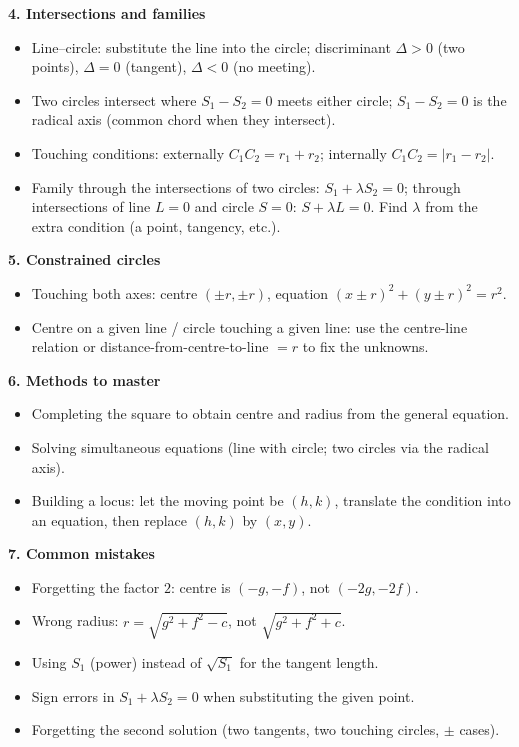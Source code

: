 \documentclass[11pt]{article}
\newcommand{\cle}[1]{{\popxbold\color{popdark}#1}}
\begin{document}
\begin{bilan}
\textbf{4. Intersections and families}
\begin{itemize}
\item Line--circle: substitute the line into the circle; discriminant $\Delta>0$ (two points), $\Delta=0$ (tangent), $\Delta<0$ (no meeting).
\item Two circles intersect where $S_1-S_2=0$ meets either circle; $S_1-S_2=0$ is the \cle{radical axis} (common chord when they intersect).
\item Touching conditions: externally $C_1C_2=r_1+r_2$; internally $C_1C_2=|r_1-r_2|$.
\item Family through the intersections of two circles: $S_1+\lambda S_2=0$; through intersections of line $L=0$ and circle $S=0$: $S+\lambda L=0$. Find $\lambda$ from the extra condition (a point, tangency, etc.).
\end{itemize}

\textbf{5. Constrained circles}
\begin{itemize}
\item Touching both axes: centre $(\pm r,\pm r)$, equation $(x\pm r)^2+(y\pm r)^2=r^2$.
\item Centre on a given line / circle touching a given line: use the centre-line relation or distance-from-centre-to-line $=r$ to fix the unknowns.
\end{itemize}

\textbf{6. Methods to master}
\begin{itemize}
\item Completing the square to obtain centre and radius from the general equation.
\item Solving simultaneous equations (line with circle; two circles via the radical axis).
\item Building a locus: let the moving point be $(h,k)$, translate the condition into an equation, then replace $(h,k)$ by $(x,y)$.
\end{itemize}

\textbf{7. Common mistakes}
\begin{itemize}
\item Forgetting the factor $2$: centre is $(-g,-f)$, not $(-2g,-2f)$.
\item Wrong radius: $r=\sqrt{g^2+f^2-c}$, not $\sqrt{g^2+f^2+c}$.
\item Using $S_1$ (power) instead of $\sqrt{S_1}$ for the tangent length.
\item Sign errors in $S_1+\lambda S_2=0$ when substituting the given point.
\item Forgetting the second solution (two tangents, two touching circles, $\pm$ cases).
\end{itemize}


\end{bilan}
\end{document}
